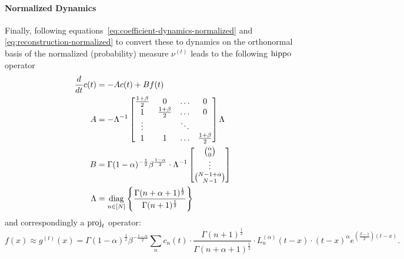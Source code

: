 \documentclass[../../hippo]{subfiles}
\begin{document}
\paragraph{Normalized Dynamics}
Finally, following equations~\eqref{eq:coefficient-dynamics-normalized} and \eqref{eq:reconstruction-normalized} to convert these to dynamics on the orthonormal basis of the normalized (probability) measure $\nu^{(t)}$ leads to the following $\operatorname{hippo}$ operator
\begin{equation}
  \begin{aligned}
    \frac{d}{d t} c(t)
    &= -A c(t) + B f(t)
    \\
    A &=
    -\Lambda^{-1}
    \begin{bmatrix}
      \frac{1+\beta}{2} & 0 & \dots & 0 \\
      1 & \frac{1+\beta}{2} & \dots & 0 \\
      \vdots & & \ddots & \\
      1 & 1 & \dots & \frac{1+\beta}{2}
    \end{bmatrix}
    \Lambda
    \\
    B &= \Gamma(1-\alpha)^{-\frac{1}{2}} \beta^{\frac{1-\alpha}{2}} \cdot \Lambda^{-1}
    \begin{bmatrix} \binom{\alpha}{0} \\ \vdots \\ \binom{N-1+\alpha}{N-1} \end{bmatrix}
    \\
    \Lambda &= \operatorname*{diag}_{n \in [N]} \left\{ \frac{\Gamma(n+\alpha+1)^{\frac{1}{2}}}{\Gamma(n+1)^{\frac{1}{2}}} \right\}
  \end{aligned}
\end{equation}
and correspondingly a $\operatorname{proj}_t$ operator:
\begin{equation}
  f(x) \approx g^{(t)}(x)
  = \Gamma(1-\alpha)^{\frac{1}{2}} \beta^{-\frac{1-\alpha}{2}}
  \sum_n c_n(t) \cdot \frac{\Gamma(n+1)^{\frac{1}{2}}}{\Gamma(n+\alpha+1)^{\frac{1}{2}}} \cdot L^{(\alpha)}_n(t-x) \cdot (t-x)^\alpha e^{\left( \frac{\beta-1}{2} \right)(t-x)}.
\end{equation}
\end{document}

